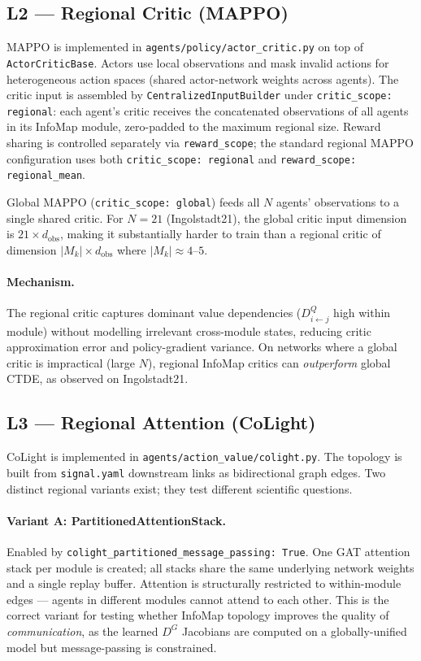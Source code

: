 \documentclass{article}
\begin{document}
\subsection{L2 --- Regional Critic (MAPPO)}
\label{app:arch:mappo}

MAPPO is implemented in \texttt{agents/policy/actor\_critic.py} on top of
\texttt{ActorCriticBase}.
Actors use local observations and mask invalid actions for heterogeneous
action spaces (shared actor-network weights across agents).
The critic input is assembled by \texttt{CentralizedInputBuilder} under
\texttt{critic\_scope: regional}: each agent's critic receives the concatenated
observations of all agents in its InfoMap module, zero-padded to the maximum
regional size.
Reward sharing is controlled separately via \texttt{reward\_scope}; the
standard regional MAPPO configuration uses both
\texttt{critic\_scope: regional} and \texttt{reward\_scope: regional\_mean}.

Global MAPPO (\texttt{critic\_scope: global}) feeds all $N$ agents'
observations to a single shared critic.
For $N = 21$ (Ingolstadt21), the global critic input dimension is $21 \times
    d_{\mathrm{obs}}$, making it substantially harder to train than a regional
critic of dimension $|M_k| \times d_{\mathrm{obs}}$ where $|M_k| \approx 4$--$5$.

\paragraph{Mechanism.}
The regional critic captures dominant value dependencies
($D^Q_{i\leftarrow j}$ high within module) without modelling irrelevant
cross-module states, reducing critic approximation error and policy-gradient
variance.
On networks where a global critic is impractical (large $N$), regional InfoMap
critics can \emph{outperform} global CTDE, as observed on Ingolstadt21.

\subsection{L3 --- Regional Attention (CoLight)}
\label{app:arch:colight}

CoLight is implemented in \texttt{agents/action\_value/colight.py}.
The topology is built from \texttt{signal.yaml} downstream links as
bidirectional graph edges.
Two distinct regional variants exist; they test different scientific questions.

\paragraph{Variant A: PartitionedAttentionStack.}
Enabled by \texttt{colight\_partitioned\_message\_passing: True}.
One GAT attention stack per module is created; all stacks share the same
underlying network weights and a single replay buffer.
Attention is structurally restricted to within-module edges --- agents in
different modules cannot attend to each other.
This is the correct variant for testing whether InfoMap topology improves
the quality of \emph{communication}, as the learned $D^G$ Jacobians are
computed on a globally-unified model but message-passing is constrained.
\end{document}
